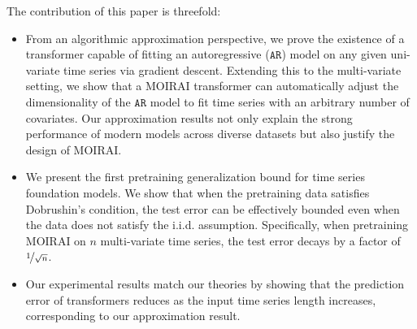 The contribution of this paper is threefold:
\begin{itemize}
    \item 
    From an algorithmic approximation perspective, we prove the existence of a transformer capable of fitting an autoregressive ($\mathtt{AR}$) model on any given uni-variate time series via gradient descent. 
    Extending this to the multi-variate setting, we show that a MOIRAI transformer can automatically adjust the dimensionality of the $\mathtt{AR}$ model to fit time series with an arbitrary number of covariates. 
    Our approximation results not only explain the strong performance of modern models across diverse datasets but also justify the design of MOIRAI.

    \item
    We present the first pretraining generalization bound for time series foundation models.
    We show that when the pretraining data satisfies Dobrushin's condition, the test error can be effectively bounded even when the data does not satisfy the i.i.d. assumption.
    Specifically, when pretraining MOIRAI on $n$ multi-variate time series, the test error decays by a factor of $\nicefrac{1}{\sqrt{n}}$.

    \item 
    Our experimental results match our theories by showing that the prediction error of transformers reduces as the input time series length increases, corresponding to our approximation result.
    
\end{itemize}






